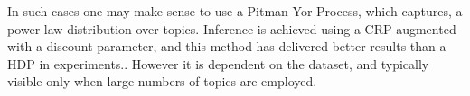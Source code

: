 In such cases one may make sense to use a Pitman-Yor Process, which captures, a power-law distribution over topics. Inference is achieved using a CRP augmented with a discount parameter, and this method has delivered better results than a HDP in experiments.\cite{Buntine2014}. However it is dependent on the dataset, and typically visible only when large numbers of topics are employed. 

%
%
%
